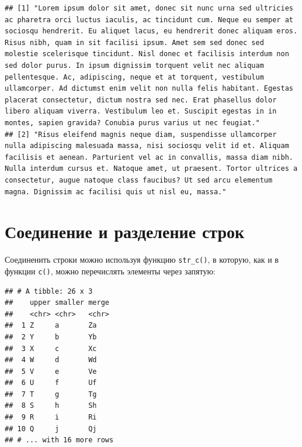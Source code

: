 \documentclass[
]{book}
\newenvironment{Shaded}{\begin{snugshade}}{\end{snugshade}}
\newcommand{\DataTypeTok}[1]{\textcolor[rgb]{0.13,0.29,0.53}{#1}}
\newcommand{\KeywordTok}[1]{\textcolor[rgb]{0.13,0.29,0.53}{\textbf{#1}}}
\newcommand{\NormalTok}[1]{#1}
\newcommand{\OperatorTok}[1]{\textcolor[rgb]{0.81,0.36,0.00}{\textbf{#1}}}
\newcommand{\StringTok}[1]{\textcolor[rgb]{0.31,0.60,0.02}{#1}}
\begin{document}
\begin{verbatim}
## [1] "Lorem ipsum dolor sit amet, donec sit nunc urna sed ultricies ac pharetra orci luctus iaculis, ac tincidunt cum. Neque eu semper at sociosqu hendrerit. Eu aliquet lacus, eu hendrerit donec aliquam eros. Risus nibh, quam in sit facilisi ipsum. Amet sem sed donec sed molestie scelerisque tincidunt. Nisl donec et facilisis interdum non sed dolor purus. In ipsum dignissim torquent velit nec aliquam pellentesque. Ac, adipiscing, neque et at torquent, vestibulum ullamcorper. Ad dictumst enim velit non nulla felis habitant. Egestas placerat consectetur, dictum nostra sed nec. Erat phasellus dolor libero aliquam viverra. Vestibulum leo et. Suscipit egestas in in montes, sapien gravida? Conubia purus varius ut nec feugiat."
## [2] "Risus eleifend magnis neque diam, suspendisse ullamcorper nulla adipiscing malesuada massa, nisi sociosqu velit id et. Aliquam facilisis et aenean. Parturient vel ac in convallis, massa diam nibh. Nulla interdum cursus et. Natoque amet, ut praesent. Tortor ultrices a consectetur, augue natoque class faucibus? Ut sed arcu elementum magna. Dignissim ac facilisi quis ut nisl eu, massa."
\end{verbatim}

\hypertarget{ux441ux43eux435ux434ux438ux43dux435ux43dux438ux435-ux438-ux440ux430ux437ux434ux435ux43bux435ux43dux438ux435-ux441ux442ux440ux43eux43a}{%
\section{Соединение и разделение строк}\label{ux441ux43eux435ux434ux438ux43dux435ux43dux438ux435-ux438-ux440ux430ux437ux434ux435ux43bux435ux43dux438ux435-ux441ux442ux440ux43eux43a}}

Соединенить строки можно используя функцию \texttt{str\_c()}, в которую, как и в функции \texttt{с()}, можно перечислять элементы через запятую:

\begin{Shaded}
\end{Shaded}

\begin{verbatim}
## # A tibble: 26 x 3
##    upper smaller merge
##    <chr> <chr>   <chr>
##  1 Z     a       Za   
##  2 Y     b       Yb   
##  3 X     c       Xc   
##  4 W     d       Wd   
##  5 V     e       Ve   
##  6 U     f       Uf   
##  7 T     g       Tg   
##  8 S     h       Sh   
##  9 R     i       Ri   
## 10 Q     j       Qj   
## # ... with 16 more rows
\end{verbatim}
\end{document}
